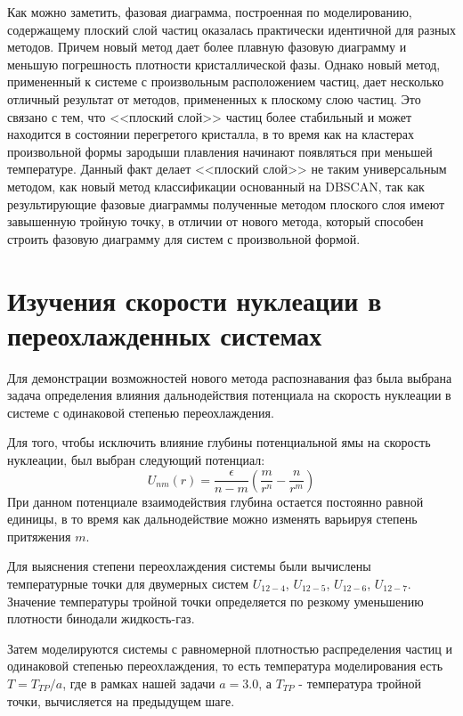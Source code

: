 Как можно заметить, фазовая диаграмма, построенная по моделированию, содержащему плоский слой частиц оказалась практически идентичной для разных методов.
Причем новый метод дает более плавную фазовую диаграмму и меньшую погрешность плотности кристаллической фазы.
Однако новый метод, примененный к системе с произвольным расположением частиц, дает несколько отличный результат от методов, примененных к плоскому слою частиц.
Это связано с тем, что <<плоский слой>> частиц более стабильный и может находится в состоянии перегретого кристалла, в то время как на кластерах произвольной формы зародыши плавления начинают появляться при меньшей температуре.
Данный факт делает <<плоский слой>> не таким универсальным методом, как новый метод классификации основанный на DBSCAN, так как результирующие фазовые диаграммы полученные методом плоского слоя имеют завышенную тройную точку, в отличии от нового метода, который способен строить фазовую диаграмму для систем с произвольной формой.


\section{Изучения скорости нуклеации в переохлажденных системах}
\label{PRIMe-SecNucleation}

Для демонстрации возможностей нового метода распознавания фаз была выбрана задача определения влияния дальнодействия потенциала на скорость нуклеации в системе с одинаковой степенью переохлаждения.

Для того, чтобы исключить влияние глубины потенциальной ямы на скорость нуклеации, был выбран следующий потенциал:
\begin{equation}
U_{nm}(r)=\frac{\epsilon}{n-m}\left(\frac{m}{r^n}-\frac{n}{r^m}\right) \label{NMP-eq1}
\end{equation}
При данном потенциале взаимодействия глубина остается постоянно равной единицы, в то время как дальнодействие можно изменять варьируя степень притяжения $m$.

Для выяснения степени переохлаждения системы были вычислены температурные точки для двумерных систем $U_{12-4}$, $U_{12-5}$, $U_{12-6}$, $U_{12-7}$. Значение температуры тройной точки определяется по резкому уменьшению плотности бинодали жидкость-газ.

Затем моделируются системы с равномерной плотностью распределения частиц и одинаковой степенью переохлаждения, то есть температура моделирования есть $T = T_{TP} / a$, где в рамках нашей задачи $a = 3.0$, а $T_{TP}$ - температура тройной точки, вычисляется на предыдущем шаге.

